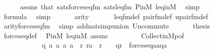 \begin{isabellebody}
\ \ \ \ \isamarkupfalse%
\ assms\ that\ sats{\isacharunderscore}{\kern0pt}forces{\isacharunderscore}{\kern0pt}eq{\isacharprime}{\kern0pt}{\isacharunderscore}{\kern0pt}fm\ sats{\isacharunderscore}{\kern0pt}leq{\isacharunderscore}{\kern0pt}fm\ P{\isacharunderscore}{\kern0pt}in{\isacharunderscore}{\kern0pt}M\ leq{\isacharunderscore}{\kern0pt}in{\isacharunderscore}{\kern0pt}M\ \isamarkupfalse%
\ simp\isanewline
\ \ \isamarkupfalse%
\isanewline
\ \ \isamarkupfalse%
\ {\isachardoublequoteopen}{\isacharquery}{\kern0pt}{\isasymphi}{\isasymin}formula{\isachardoublequoteclose}\ \isamarkupfalse%
\ simp\isanewline
\ \ \isamarkupfalse%
\isanewline
\ \ \isamarkupfalse%
\ {\isachardoublequoteopen}arity{\isacharparenleft}{\kern0pt}{\isacharquery}{\kern0pt}{\isasymphi}{\isacharparenright}{\kern0pt}{\isacharequal}{\kern0pt}{}{\isachardoublequoteclose}\ \isanewline
\ \ \ \ \isamarkupfalse%
\ leq{\isacharunderscore}{\kern0pt}fm{\isacharunderscore}{\kern0pt}def\ pair{\isacharunderscore}{\kern0pt}fm{\isacharunderscore}{\kern0pt}def\ upair{\isacharunderscore}{\kern0pt}fm{\isacharunderscore}{\kern0pt}def\isanewline
\ \ \ \ \isamarkupfalse%
\ arity{\isacharunderscore}{\kern0pt}forces{\isacharunderscore}{\kern0pt}eq{\isacharunderscore}{\kern0pt}fm\ \isamarkupfalse%
\ {\isacharparenleft}{\kern0pt}simp\ add{\isacharcolon}{\kern0pt}nat{\isacharunderscore}{\kern0pt}simp{\isacharunderscore}{\kern0pt}union\ Un{\isacharunderscore}{\kern0pt}commute{\isacharparenright}{\kern0pt}\isanewline
\ \ \isamarkupfalse%
\isanewline
\ \ \isamarkupfalse%
\ {\isacharquery}{\kern0pt}thesis\ \isanewline
\ \ \ \ \isamarkupfalse%
\ forces{\isacharunderscore}{\kern0pt}eq{\isacharunderscore}{\kern0pt}def\ \isamarkupfalse%
\ P{\isacharunderscore}{\kern0pt}in{\isacharunderscore}{\kern0pt}M\ leq{\isacharunderscore}{\kern0pt}in{\isacharunderscore}{\kern0pt}M\ assms\ \isanewline
\ \ \ \ \ \ \ \ Collect{\isacharunderscore}{\kern0pt}in{\isacharunderscore}{\kern0pt}M{\isacharunderscore}{\kern0pt}{}p{\isacharbrackleft}{\kern0pt}of\ {\isacharquery}{\kern0pt}{\isasymphi}\ {\isacharunderscore}{\kern0pt}\ {\isacharunderscore}{\kern0pt}\ {\isacharunderscore}{\kern0pt}\ {\isacharunderscore}{\kern0pt}\ {\isacharunderscore}{\kern0pt}\ \isanewline
\ \ \ \ \ \ \ \ \ \ \ \ {\isachardoublequoteopen}{\isasymlambda}q\ a{}\ a{}\ a{}\ a{}{\isachardot}{\kern0pt}\ {\isasymexists}{\isasymsigma}{\isachardot}{\kern0pt}\ {\isasymexists}r{\isachardot}{\kern0pt}\ r{\isasymin}a{}\ {\isasymand}\ {\isasymlangle}{\isasymsigma}{\isacharcomma}{\kern0pt}r{\isasymrangle}\ {\isasymin}\ {\isasymtau}\ {\isasymand}\ q{\isasympreceq}r\ {\isasymand}\ forces{\isacharunderscore}{\kern0pt}eq{\isacharprime}{\kern0pt}{\isacharparenleft}{\kern0pt}a{}{\isacharcomma}{\kern0pt}a{}{\isacharcomma}{\kern0pt}q{\isacharcomma}{\kern0pt}a{}{\isacharcomma}{\kern0pt}{\isasymsigma}{\isacharparenright}{\kern0pt}{\isachardoublequoteclose}{\isacharbrackright}{\kern0pt}\ \isamarkupfalse%

\end{isabellebody}

